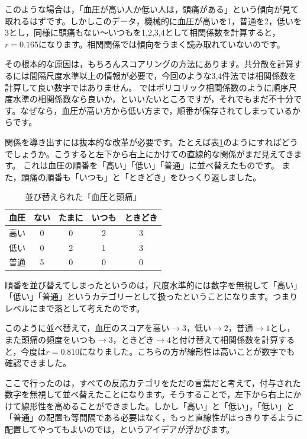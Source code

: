 \documentclass{ltjsbook}
\begin{document}
このような場合は，「血圧が高い人か低い人は，頭痛がある」という傾向が見て取れるはずです。しかしこのデータ，機械的に血圧が高いを1，普通を2，低いを3とし，同様に頭痛もない〜いつもを1,2,3,4として相関係数を計算すると，$r=0.165$になります。相関関係では傾向をうまく読み取れていないのです。

その根本的な原因は，もちろんスコアリングの方法にあります。共分散を計算するには間隔尺度水準以上の情報が必要で，今回のような3,4件法では相関係数を計算して良い数字ではありません。
ではポリコリック相関係数のように順序尺度水準の相関係数なら良いか，といいたいところですが，それでもまだ不十分です。なぜなら，血圧が高い方から低い方まで，順番が保存されてしまっているからです。

関係を導き出すには抜本的な改革が必要です。たとえば表\ref{tbl::14_02}のようにすればどうでしょうか。こうすると左下から右上にかけての直線的な関係がまだ見えてきます。
これは血圧の順番を「高い」「低い」「普通」に並べ替えたものです。
また，頭痛の順番も「いつも」と「ときどき」をひっくり返しました。
\begin{table}[ht]
	\begin{center}
		\caption{並び替えられた「血圧と頭痛」}
		\begin{tabular}{c|cccc}
			血圧 & ない & たまに & いつも & ときどき \\
			\hline
			高い & 0  & 0   & 2   & 3    \\
			低い & 0  & 2   & 1   & 3    \\
			普通 & 5  & 0   & 0   & 0    \\
		\end{tabular}
		\label{tbl::14_02}
	\end{center}
\end{table}
順番を並び替えてしまったというのは，尺度水準的には数字を無視して「高い」「低い」「普通」というカテゴリーとして扱ったということになります。つまりレベルにまで落として考えたのです。

このように並べ替えて，血圧のスコアを高い$\to3$，低い$\to2$，普通$\to1$とし，また頭痛の頻度をいつも$\to3$，ときどき$\to4$と付け替えて相関係数を計算すると，今度は$r=0.810$になりました。こちらの方が線形性は高いことが数字でも確認できました。

ここで行ったのは，すべての反応カテゴリをただの言葉だと考えて，付与された数字を無視して並べ替えたことになります。そうすることで，左下から右上にかけて線形性を高めることができました。しかし「高い」と「低い」，「低い」と「普通」の配置も等間隔である必要はなく，もっと直線性がはっきりするように配置してやってもよいのでは，というアイデアが浮かびます。
\end{document}
